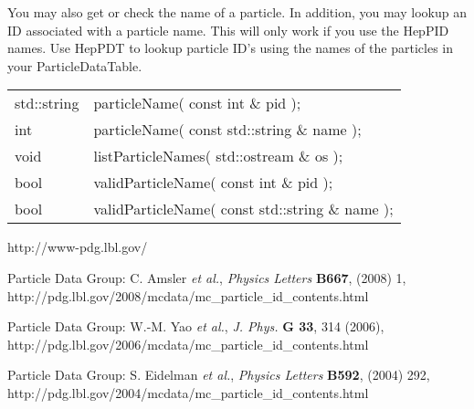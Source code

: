 You may also get or check the name of a particle.  
In addition, you may lookup an ID associated with a particle name.  
This will only work if you use the HepPID names. 
Use HepPDT to lookup particle ID's using the names of the 
particles in your ParticleDataTable.

\begin{center}
\begin{tabular}{ll}
std::string &  particleName( const int \& pid ); \\
int         &  particleName( const std::string \& name ); \\
void        &  listParticleNames( std::ostream \& os ); \\
bool        &  validParticleName( const int \& pid ); \\
bool        &  validParticleName( const std::string \& name ); \\
\end{tabular}
\end{center}

\def\etal{{\it et al.}}

\begin{thebibliography}{9}

http://www-pdg.lbl.gov/ 

Particle Data Group: C. Amsler \etal, \emph{Physics Letters} \textbf{B667}, (2008) 1, 
\newline
http://pdg.lbl.gov/2008/mcdata/mc\_particle\_id\_contents.html

Particle Data Group: W.-M. Yao \etal, \emph{J. Phys.} \textbf{G 33}, 314 (2006), 
\newline
http://pdg.lbl.gov/2006/mcdata/mc\_particle\_id\_contents.html

Particle Data Group: S. Eidelman  \etal, \emph{Physics Letters} \textbf{B592}, (2004) 292, 
\newline
http://pdg.lbl.gov/2004/mcdata/mc\_particle\_id\_contents.html

\end{thebibliography}

\newpage

